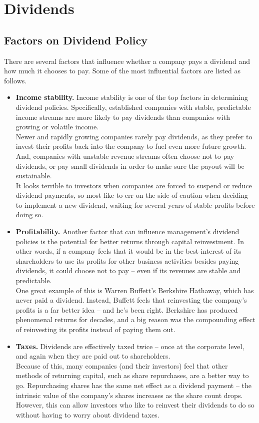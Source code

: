 \section{Dividends}

\subsection{Factors on Dividend Policy}
There are several factors that influence whether a company pays a dividend and how much it chooses to pay. Some of the most influential factors are listed as follows.
\begin{itemize}
	\item \textbf{Income stability.} 
	Income stability is one of the top factors in determining dividend policies. Specifically, established companies with stable, predictable income streams are more likely to pay dividends than companies with growing or volatile income.\\
	Newer and rapidly growing companies rarely pay dividends, as they prefer to invest their profits back into the company to fuel even more future growth. And, companies with unstable revenue streams often choose not to pay dividends, or pay small dividends in order to make sure the payout will be sustainable.\\
	It looks terrible to investors when companies are forced to suspend or reduce dividend payments, so most like to err on the side of caution when deciding to implement a new dividend, waiting for several years of stable profits before doing so.	
	
	\item  \textbf{Profitability.}
	Another factor that can influence management's dividend policies is the potential for better returns through capital reinvestment. In other words, if a company feels that it would be in the best interest of its shareholders to use its profits for other business activities besides paying dividends, it could choose not to pay – even if its revenues are stable and predictable.\\
	One great example of this is Warren Buffett's Berkshire Hathaway, which has never paid a dividend. Instead, Buffett feels that reinvesting the company's profits is a far better idea -- and he's been right. Berkshire has produced phenomenal returns for decades, and a big reason was the compounding effect of reinvesting its profits instead of paying them out.
	
	\item \textbf{Taxes.}
	Dividends are effectively taxed twice -- once at the corporate level, and again when they are paid out to shareholders.\\
	Because of this, many companies (and their investors) feel that other methods of returning capital, such as share repurchases, are a better way to go. Repurchasing shares has the same net effect as a dividend payment -- the intrinsic value of the company's shares increases as the share count drops. However, this can allow investors who like to reinvest their dividends to do so without having to worry about dividend taxes.
	

\end{itemize}
